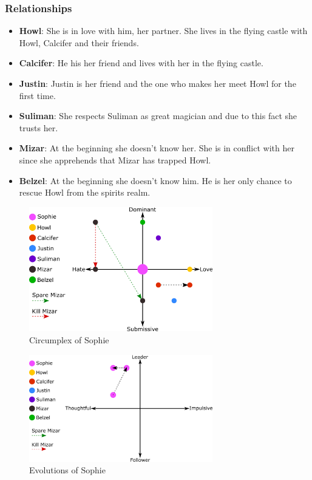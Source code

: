 \subsubsection*{Relationships}
\begin{itemize}
\item \textbf{Howl}: She is in love with him, her partner. She lives in the flying castle with Howl, Calcifer and their friends.
\item \textbf{Calcifer}: He his her friend and lives with her in the flying castle.
\item \textbf{Justin}: Justin is her friend and the one who makes her meet Howl for the first time.
\item \textbf{Suliman}: She respects Suliman as great magician and due to this fact she trusts her.
\item \textbf{Mizar}: At the beginning she doesn’t know her. She is in conflict with her since she apprehends that Mizar has trapped Howl.
\item \textbf{Belzel}: At the beginning she doesn’t know him. He is her only chance to rescue Howl from the spirits realm.
\end{itemize}

\begin{figure}[H]
  \centering
  \includegraphics[width=8cm]{Images/Diagrams/Circumplexes/sophieCircumplex}
  \caption{Circumplex of Sophie}
\end{figure}

\begin{figure}[H]
  \centering
  \includegraphics[width=8cm]{Images/Diagrams/Evolutions/sophieEvolution}
  \caption{Evolutions of Sophie}
\end{figure}

